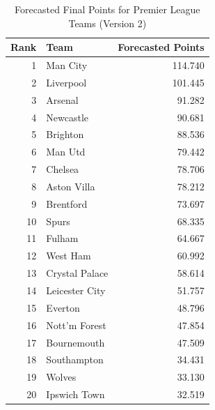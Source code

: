 \documentclass{article}
\begin{document}
\begin{table}[p]
    \centering
    \begin{tabular}{rlr}
    \toprule
    \textbf{Rank} & \textbf{Team} & \textbf{Forecasted Points} \\
    \midrule
    1  & Man City         & 114.740 \\
    2  & Liverpool        & 101.445 \\
    3  & Arsenal          & 91.282  \\
    4  & Newcastle        & 90.681  \\
    5  & Brighton         & 88.536  \\
    6  & Man Utd          & 79.442  \\
    7  & Chelsea          & 78.706  \\
    8  & Aston Villa      & 78.212  \\
    9  & Brentford        & 73.697  \\
    10 & Spurs            & 68.335  \\
    11 & Fulham           & 64.667  \\
    12 & West Ham         & 60.992  \\
    13 & Crystal Palace   & 58.614  \\
    14 & Leicester City   & 51.757  \\
    15 & Everton          & 48.796  \\
    16 & Nott'm Forest    & 47.854  \\
    17 & Bournemouth      & 47.509  \\
    18 & Southampton      & 34.431  \\
    19 & Wolves           & 33.130  \\
    20 & Ipswich Town     & 32.519  \\
    \bottomrule
    \end{tabular}
    \caption{Forecasted Final Points for Premier League Teams (Version 2)}
    \label{tab:forecasted_points}
\end{table}
\end{document}
